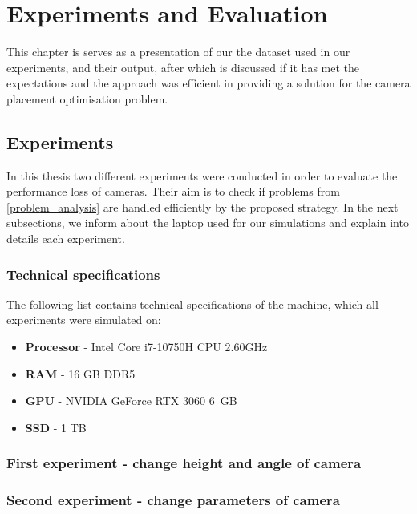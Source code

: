 \chapter{Experiments and Evaluation}
\label{evaluation}

This chapter is serves as a presentation of our the dataset used in our experiments, and their output, after which is discussed if it has met the expectations and the approach was efficient in providing a solution for the camera placement optimisation problem.

\section{Experiments}
In this thesis two different experiments were conducted in order to evaluate the performance loss of cameras. Their aim is to check if problems from \ref{problem_analysis} are handled efficiently by the proposed strategy. In the next subsections, we inform about the laptop used for our simulations and explain into details each experiment.

\subsection{Technical specifications}
The following list contains technical specifications of the machine, which all experiments were simulated on:
\begin{itemize}
    \item \textbf{Processor} - Intel Core i7-10750H CPU 2.60GHz
    \item \textbf{RAM} - 16 GB DDR5
    \item \textbf{GPU} - NVIDIA GeForce RTX 3060 6 GB
    \item \textbf{SSD} - 1 TB
\end{itemize}

\subsection{First experiment - change height and angle of camera}

\subsection{Second experiment - change parameters of camera}

